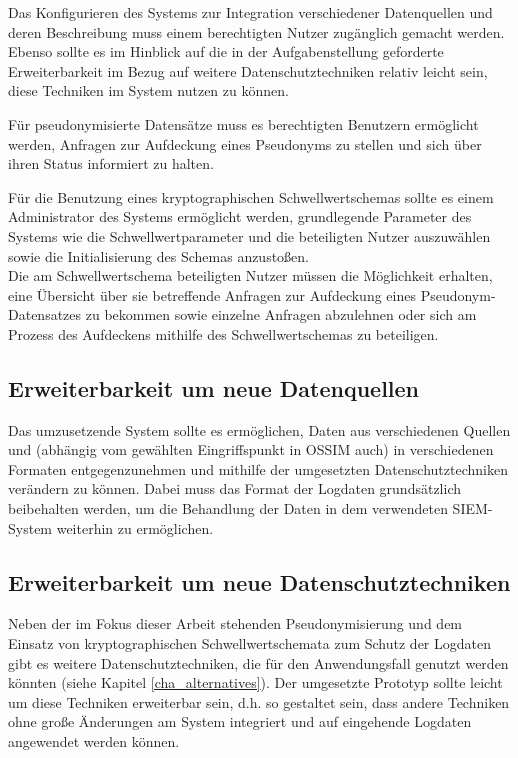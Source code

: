 Das Konfigurieren des Systems zur Integration verschiedener Datenquellen und deren Beschreibung muss einem berechtigten Nutzer zugänglich gemacht werden. Ebenso sollte es im Hinblick auf die in der Aufgabenstellung geforderte Erweiterbarkeit im Bezug auf weitere Datenschutztechniken relativ leicht sein, diese Techniken im System nutzen zu können. 

Für pseudonymisierte Datensätze muss es berechtigten Benutzern ermöglicht werden, Anfragen zur Aufdeckung eines Pseudonyms zu stellen und sich über ihren Status informiert zu halten.

Für die Benutzung eines kryptographischen Schwellwertschemas sollte es einem Administrator des Systems ermöglicht werden, grundlegende Parameter des Systems wie die Schwellwertparameter und die beteiligten Nutzer auszuwählen sowie die Initialisierung des Schemas anzustoßen. \\
Die am Schwellwertschema beteiligten Nutzer müssen die Möglichkeit erhalten, eine Übersicht über sie betreffende Anfragen zur Aufdeckung eines Pseudonym-Datensatzes zu bekommen sowie einzelne Anfragen abzulehnen oder sich am Prozess des Aufdeckens mithilfe des Schwellwertschemas zu beteiligen. 

\subsection{Erweiterbarkeit um neue Datenquellen}

\label{subsec_impl_requirements_differentsources}

Das umzusetzende System sollte es ermöglichen, Daten aus verschiedenen Quellen und (abhängig vom gewählten Eingriffspunkt in OSSIM auch) in verschiedenen Formaten entgegenzunehmen und mithilfe der umgesetzten Datenschutztechniken verändern zu können. Dabei muss das Format der Logdaten grundsätzlich beibehalten werden, um die Behandlung der Daten in dem verwendeten SIEM-System weiterhin zu ermöglichen.

\subsection{Erweiterbarkeit um neue Datenschutztechniken}

\label{subsec_impl_requirements_plugins}

Neben der im Fokus dieser Arbeit stehenden Pseudonymisierung und dem Einsatz von kryptographischen Schwellwertschemata zum Schutz der Logdaten gibt es weitere Datenschutztechniken, die für den Anwendungsfall genutzt werden könnten (siehe Kapitel \ref{cha_alternatives}). Der umgesetzte Prototyp sollte leicht um diese Techniken erweiterbar sein, d.h. so gestaltet sein, dass andere Techniken ohne große Änderungen am System integriert und auf eingehende Logdaten angewendet werden können.

